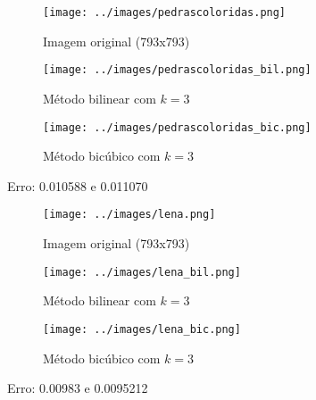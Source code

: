 \documentclass[leqno]{article}
\begin{document}
\begin{figure}[H]
    \centering
    \begin{subfigure}{.33\textwidth}
      \centering
      \texttt{[image: ../images/pedrascoloridas.png]}
      \caption{Imagem original (793x793) }
      \label{fig:sub1}
    \end{subfigure}%
    \begin{subfigure}{.33\textwidth}
      \centering
      \texttt{[image: ../images/pedrascoloridas\_bil.png]}
      \caption{Método bilinear com $k = 3$}
      \label{fig:sub2}
    \end{subfigure}
    \begin{subfigure}{.33\textwidth}
        \centering
        \texttt{[image: ../images/pedrascoloridas\_bic.png]}
        \caption{Método bicúbico com $k = 3$}
        \label{fig:sub1}
      \end{subfigure}%
    \caption{Erro: 0.010588 e 0.011070}
    \label{fig:test}
\end{figure}

\begin{figure}[H]
    \centering
    \begin{subfigure}{.33\textwidth}
      \centering
      \texttt{[image: ../images/lena.png]}
      \caption{Imagem original (793x793) }
      \label{fig:sub1}
    \end{subfigure}%
    \begin{subfigure}{.33\textwidth}
      \centering
      \texttt{[image: ../images/lena\_bil.png]}
      \caption{Método bilinear com $k = 3$}
      \label{fig:sub2}
    \end{subfigure}
    \begin{subfigure}{.33\textwidth}
        \centering
        \texttt{[image: ../images/lena\_bic.png]}
        \caption{Método bicúbico com $k = 3$}
        \label{fig:sub1}
      \end{subfigure}%
    \caption{Erro: 0.00983 e 0.0095212}
    \label{fig:test}
\end{figure}
\end{document}
